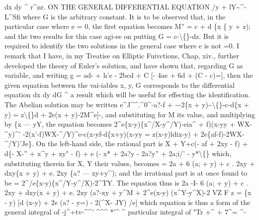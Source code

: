 \documentclass[12pt,a4paper]{article}
\begin{document}
dx
dy
\textasciicircum{}
r\textasciicircum{}nr.
ON THE GENERAL DIFFERENTIAL EQUATION
/y + lY\textasciitilde{}\textasciicircum{}-
L\textasciicircum{}Sfi
where G
is
the
arbitrary
constant.
It
is
to be
observed
that,
in
the
particular
case
where
e = 0, the
first equation becomes
M'' = c + d \{x \textbullet{}\{ y + z);
and the two results
for this case
agi-ee on putting G = c-\textbackslash\{\}-dz.
But
it
is
required
to
identify
the
two
solutions
in
the
general
case
where
e
is
not =0.
I remark that
I
have,
in my
Treatise on
Elliptic
Fuivctions, Chap,
xiv., further
developed
the
theory of
Euler's
solution, and
have shown
that, regarding G as
variable,
and writing
g = ad- + h'e - 2bcd + C [- 4ae + 6d + (C - c)=],
then
the
given
equation
between
the
vai-iables
x,
y, G
corresponds
to
the
differential
equation
dx
dy
dG
\textasciicircum{}
a
result
which
will
be
useful
for
effecting
the
identification.
The
Abelian
solution
may be written
e\textasciicircum{}J\textasciicircum{}\textasciicircum{}.\textasciicircum{}0\textasciicircum{}-a?-f + \textasciitilde{}-2\{x + y)\textasciitilde{}\textbackslash\{\}-c-d\{x + y) = z\textbackslash\{\}d + 2e(x + y)-2M\textasciicircum{}e]-,
and substituting
for M its
value, and multiplying by \{x --- yY, the equation becomes
2\textasciicircum{}e\{x-y)\{x\textasciicircum{}/X-y\textasciicircum{}/Y)-eia\textasciicircum{} + f)(x-yy + WX-\textasciicircum{}y)\textasciicircum{}'
-2(x'-f)WX-\textasciicircum{}/Y)\textasciicircum{}e-c(x-yf-d\{x+y)(x-yy
= z(x-y)ldix-y) + 2e\{af-f)-2WX-\textasciicircum{}/Y)'Je\}.
On the left-hand
side, the rational
part
is
X + Y+c(- af + 2xy - f) + d\{-
X-'' + x\textasciicircum{}y + xy" - f) + e (- x* + 2a?y - 2a?y'' + 2a;i/' - y*\textbackslash\{\}
which, substituting therein
for X, Y their
values, becomes
= 2a + 6 (a; + y) + c
. 2xy + dxy\{x + y) + e. 2xy \{a? --- xy+y\textasciicircum{});
and the
irrational part
is at once found
to be
= 2\textasciicircum{}/e\{x-y)\{x\textasciicircum{}/Y-y\textasciicircum{}/X)-2\textasciicircum{}TY.
The equation thus
is
2a -I- 6 (a; + y) + c
. 2xy + dxy(x + y) + e. 2xy (a?-xy + y\textasciicircum{}M
+ 2\textasciicircum{}e(x-y) (x\textasciicircum{}Y-y\textasciicircum{}X)-2 VZ F
z =
\{x - y) [d (x-y) + 2e (a? - y=) - 2(\textasciicircum{}X- JY) /e]
which
equation
is
thus
a
form
of
the
general
integral
of -j\textasciicircum{}+tv-\textasciicircum{}\textasciicircum{}'
\textasciicircum{}\textasciicircum{}\textasciicircum{}
*'\textregistered{}\textasciicircum{}
\textasciicircum{}
particular integral
of "Tr +\textasciicircum{} + 7\textasciicircum{}= \textasciicircum{}-
\end{document}
